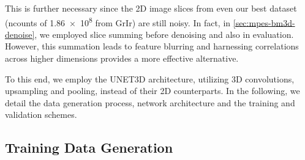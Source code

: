 This is further necessary since the 2D image slices from even our best dataset (\gls{ncounts} of \num{1.86e8} from \gls{GrIr}) are still noisy. In fact, in \cref{sec:mpes-bm3d-denoise}, we employed slice summing before denoising and also in evaluation. However, this summation leads to feature blurring and harnessing correlations across higher dimensions provides a more effective alternative.

To this end, we employ the UNET3D architecture, utilizing 3D convolutions, upsampling and pooling, instead of their 2D counterparts. In the following, we detail the data generation process, network architecture and the training and validation schemes.

\subsection{Training Data Generation}
